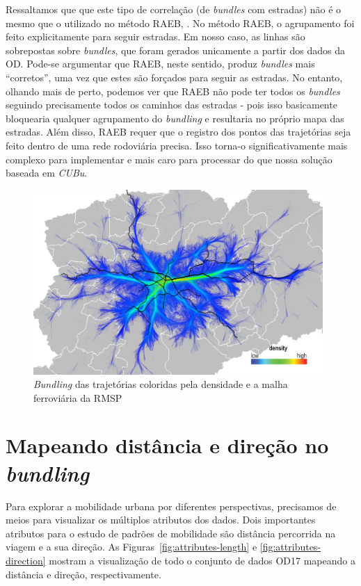 Ressaltamos que que este tipo de correlação (de \emph{bundles} com estradas) não
é o mesmo que o utilizado no método RAEB, \citet{zeng:19}. No método RAEB, o
agrupamento foi feito explicitamente para seguir estradas. Em nosso caso, as
linhas são sobrepostas sobre \emph{bundles}, que foram gerados unicamente a partir dos
dados da OD. Pode-se argumentar que RAEB, neste sentido, produz \emph{bundles}
mais ``corretos'', uma vez que estes são forçados para seguir as estradas. No
entanto, olhando mais de perto, podemos ver que RAEB não pode ter todos os
\emph{bundles} seguindo precisamente todos os caminhos das estradas - pois isso
basicamente bloquearia qualquer agrupamento do \emph{bundling} e resultaria no próprio
mapa das estradas. Além disso, RAEB requer que o registro dos pontos das trajetórias
seja feito dentro de uma rede rodoviária precisa. Isso torna-o
significativamente mais complexo para implementar e mais caro para processar do
que nossa solução baseada em \emph{CUBu}.

\begin{figure}[!htb]
  \centering
  \captionsetup{justification=centering}
  \includegraphics[width=0.98\textwidth]{../figuras/rail-lines.png}
    \caption{\emph{Bundling} das trajetórias coloridas pela densidade e a malha ferroviária da RMSP}
  \label{fig:rails}  
\end{figure}

\section{Mapeando distância e direção no \emph{bundling}}
\label{sec:length-direction}

Para explorar a mobilidade urbana por diferentes perspectivas, precisamos de
meios para visualizar os múltiplos atributos dos dados. Dois
importantes atributos para o estudo de padrões de mobilidade são distância
percorrida na viagem e a sua direção. As Figuras~\ref{fig:attributes-length} e
\ref{fig:attributes-direction} mostram a visualização de todo o conjunto de
dados OD17 mapeando a distância e direção, respectivamente.

